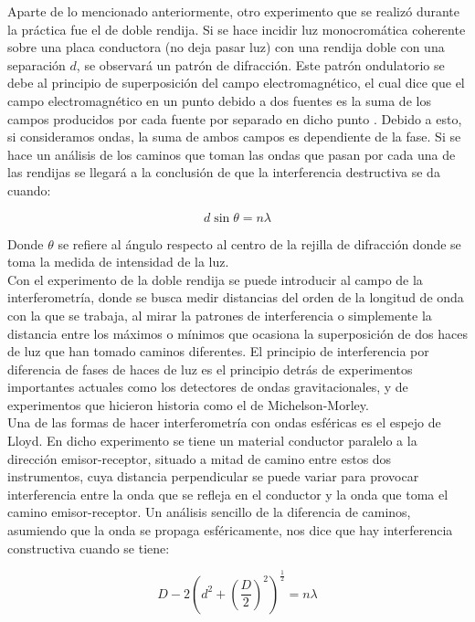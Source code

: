 \documentclass[prb,aps,twocolumn,preprintnumbers,amsmath,amssymb]{revtex4}
\begin{document}
Aparte de lo mencionado anteriormente, otro experimento que se realizó durante la práctica fue el de 	doble rendija. Si se hace incidir luz monocromática coherente sobre una placa conductora (no deja pasar luz) con una rendija doble con una separación $d$, se observará un patrón de difracción. Este patrón ondulatorio se debe al principio de superposición del campo electromagnético, el cual dice que el campo electromagnético en un punto debido a dos fuentes es la suma de los campos producidos por cada fuente por separado en dicho punto \cite{Griffiths}. Debido a esto, si consideramos ondas, la suma de ambos campos es dependiente de la fase. Si se hace un análisis de los caminos que toman las ondas que pasan por cada una de las rendijas se llegará a la conclusión de que la interferencia destructiva se da cuando:

\begin{equation}
d\sin{\theta} = n\lambda
\label{eq:interferencia}
\end{equation}

Donde $\theta$ se refiere al ángulo respecto al centro de la rejilla de difracción donde se toma la medida de intensidad de la luz.\\

Con el experimento de la doble rendija se puede introducir al campo de la interferometría, donde se busca medir distancias del orden de la longitud de onda con la que se trabaja, al mirar la patrones de interferencia o simplemente la distancia entre los máximos o mínimos que ocasiona la superposición de dos haces de luz que han tomado caminos diferentes. El principio de interferencia por diferencia de fases de haces de luz es el principio detrás de experimentos importantes actuales como los detectores de ondas gravitacionales, y de experimentos que hicieron historia como el de Michelson-Morley.\\

Una de las formas de hacer interferometría con ondas esféricas es el espejo de Lloyd. En dicho experimento se tiene un material conductor paralelo a la dirección emisor-receptor, situado a mitad de camino entre estos dos instrumentos, cuya distancia perpendicular se puede variar para provocar interferencia entre la onda que se refleja en el conductor y la onda que toma el camino emisor-receptor. Un análisis sencillo de la diferencia de caminos, asumiendo que la onda se propaga esféricamente, nos dice que hay interferencia constructiva cuando se tiene:

\begin{equation}
D-2{\left(d^2 + {\left(\frac{D}{2}\right)}^2\right)}^\frac{1}{2} = n\lambda
\label{eq:Lloyd}
\end{equation}
\end{document}
